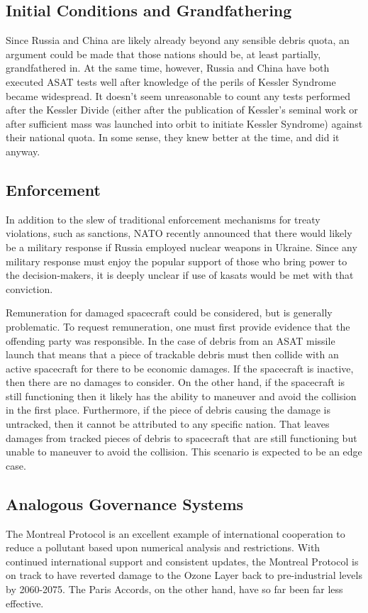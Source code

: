 \subsection{Initial Conditions and Grandfathering}
Since Russia and China are likely already beyond any sensible debris
quota, an argument could be made that those nations should be, at
least partially, grandfathered in.  At the same time, however, Russia
and China have both executed ASAT tests well after knowledge of the
perils of Kessler Syndrome became widespread.  It doesn't seem
unreasonable to count any tests performed after the Kessler Divide
(either after the publication of Kessler's seminal work or after
sufficient mass was launched into orbit to initiate Kessler Syndrome)
against their national quota.  In some sense, they knew better at the
time, and did it anyway.

\subsection{Enforcement}
In addition to the slew of traditional enforcement mechanisms for
treaty violations, such as sanctions, NATO recently announced that
there would likely be a military response if Russia employed nuclear
weapons in Ukraine.\cite[nato reaction]{xxx} Since any military
response must enjoy the popular support of those who bring power to
the decision-makers, it is deeply unclear if use of \acp{kasat} would
be met with that conviction.

Remuneration for damaged spacecraft could be considered, but is
generally problematic.  To request remuneration, one must first
provide evidence that the offending party was responsible.  In the
case of debris from an ASAT missile launch that means that a piece of
trackable debris must then collide with an active spacecraft for there
to be economic damages.  If the spacecraft is inactive, then there are
no damages to consider.  On the other hand, if the spacecraft is still
functioning then it likely has the ability to maneuver and avoid the
collision in the first place.  Furthermore, if the piece of debris
causing the damage is untracked, then it cannot be attributed to any
specific nation.  That leaves damages from tracked pieces of debris to
spacecraft that are still functioning but unable to maneuver to avoid
the collision.  This scenario is expected to be an edge case.


\subsection{Analogous Governance Systems}
The Montreal Protocol is an excellent example of international
cooperation to reduce a pollutant based upon numerical analysis and
restrictions.\cite{oh-canada} With continued international support and
consistent updates, the Montreal Protocol is on track to have reverted
damage to the Ozone Layer back to pre-industrial levels by
2060-2075.\cite{oh-canada}  The Paris Accords, on the other hand, have
so far been far less effective.\cite{lousy-paris}

